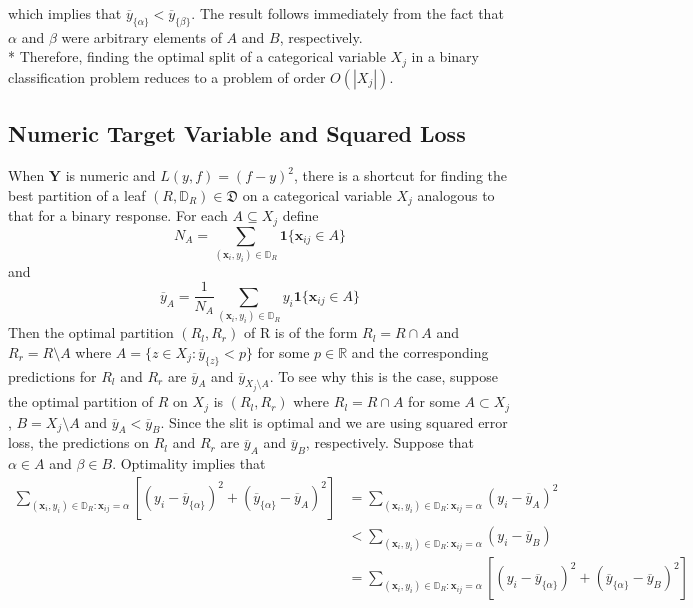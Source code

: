 \documentclass[11pt]{article}
\begin{document}
which implies that $\overline{y}_{\{\alpha\}} < \overline{y}_{\{\beta\}}$. The result follows immediately from the fact that $\alpha$ and $\beta$ were arbitrary elements of $A$ and $B$, respectively.
\\*
Therefore, finding the optimal split of a categorical variable $X_j$ in a binary classification problem reduces to a problem of order $O \left( |X_j| \right)$.
\subsection{Numeric Target Variable and Squared Loss}
When $\mathbf{Y}$ is numeric and $L \left( y , f \right) = \left( f - y \right)^2$, there is a shortcut for finding the best partition of a leaf $\left( R , \mathbb{D}_R \right) \in \mathfrak{D}$ on a categorical variable $X_j$ analogous to that for a binary response. For each $A \subseteq X_j$ define
\begin{equation}
N_A = \sum_{\left( \mathbf{x}_i, y_i \right) \in \mathbb{D}_R} \mathbf{1} \{ \mathbf{x}_{ij} \in A \}
\end{equation}
and
\begin{equation}
\overline{y}_A = \frac{1}{N_A} \sum_{\left( \mathbf{x}_i, y_i \right) \in \mathbb{D}_R} y_i \mathbf{1} \{ \mathbf{x}_{ij} \in A \}
\end{equation}
Then the optimal partition $\left( R_l , R_r \right)$ of R is of the form $R_l = R \cap A$ and $R_r = R \setminus A$ where $A = \{ z \in X_j : \overline{y}_{\{z\}} < p \}$ for some $p \in \mathbb{R}$ and the corresponding predictions for $R_l$ and $R_r$ are $\overline{y}_A$ and $\overline{y}_{X_j \setminus A}$. To see why this is the case, suppose the optimal partition of $R$ on $X_j$ is $\left( R_l , R_r \right)$ where $R_l = R \cap A$ for some $A \subset X_j$, $B = X_j \setminus A$ and $\overline{y}_A < \overline{y}_B$. Since the slit is optimal and we are using squared error loss, the predictions on $R_l$ and $R_r$ are $\overline{y}_A$ and $\overline{y}_B$, respectively. Suppose that $\alpha \in A$ and $\beta \in B$. Optimality implies that
\begin{equation}
\begin{split}
\sum_{\left( \mathbf{x}_i, y_i \right) \in \mathbb{D}_{R}: \mathbf{x}_{ij} = \alpha} \left[ \left( y_i - \overline{y}_{ \{ \alpha \} } \right)^2 + \left( \overline{y}_{ \{ \alpha \} } - \overline{y}_A \right)^2 \right]
& = \sum_{\left( \mathbf{x}_i, y_i \right) \in \mathbb{D}_{R}: \mathbf{x}_{ij} = \alpha} \left( y_i - \overline{y}_A \right)^2 \\
& < \sum_{\left( \mathbf{x}_i, y_i \right) \in \mathbb{D}_{R}: \mathbf{x}_{ij} = \alpha} \left( y_i - \overline{y}_B \right) \\
& = \sum_{\left( \mathbf{x}_i, y_i \right) \in \mathbb{D}_{R}: \mathbf{x}_{ij} = \alpha} \left[ \left( y_i - \overline{y}_{ \{ \alpha \} } \right)^2 + \left( \overline{y}_{ \{ \alpha \} } - \overline{y}_B \right)^2 \right]
\end{split}
\end{equation}
\end{document}
